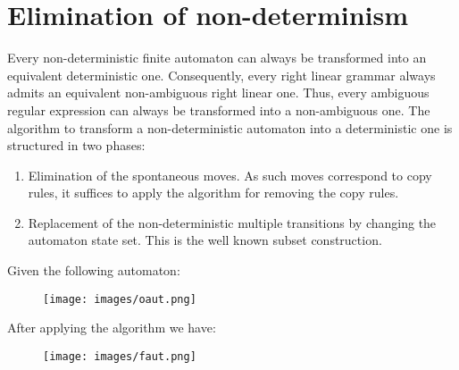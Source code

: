 \section{Elimination of non-determinism}

Every non-deterministic finite automaton can always be transformed into an equivalent deterministic one. Consequently, every right linear grammar always admits an 
equivalent non-ambiguous right linear one. Thus,  every ambiguous regular expression can always be transformed into a non-ambiguous one. The algorithm to transform a 
non-deterministic automaton into a deterministic one is structured in two phases: 
\begin{enumerate}
    \item Elimination of the spontaneous moves. As such moves correspond to copy rules, it suffices to apply the algorithm for removing the copy rules. 
    \item Replacement of the non-deterministic multiple transitions by changing the automaton state set. This is the well known subset construction. 
\end{enumerate}
\begin{example}
    Given the following automaton: 
    \begin{figure}[H]
        \centering
        \texttt{[image: images/oaut.png]}
    \end{figure}
    After applying the algorithm we have: 
    \begin{figure}[H]
        \centering
        \texttt{[image: images/faut.png]}
    \end{figure}
\end{example}